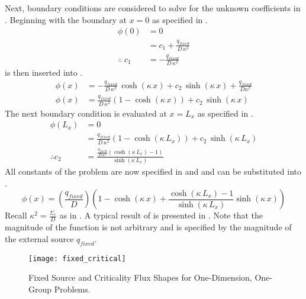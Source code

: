   Next, boundary conditions are considered to solve for the unknown coefficients
  in . Beginning with the boundary at $x=0$ as 
  specified in .
  \begin{align}
    \phi(0) &= 0 \\
    &= c_1 + \frac{q_{fixed}}{D\,\kappa^2} \\
    \label{eq:1dfixed_c1}
    \therefore \; c_1 &= - \frac{q_{fixed}}{D\,\kappa^2}
  \end{align}
   is then inserted into .
  \begin{align}
    \phi(x) &= -\frac{q_{fixed}}{D\,\kappa^2} \, \cosh(\kappa \, x) + c_2 \,
      \sinh(\kappa \, x) + \frac{q_{fixed}}{D\kappa^2} \\
    \phi(x) &= \frac{q_{fixed}}{D\,\kappa^2} \left( 1- \cosh(\kappa \, x)  
      \right) + c_2 \, \sinh(\kappa \, x)
  \end{align}
  The next boundary condition is evaluated at $x=L_x$ as specified in
  .
  \begin{align}
    \phi(L_x) &= 0 \\
    &= \frac{q_{fixed}}{D\,\kappa^2} \left( 1- \cosh(\kappa \, L_x )  \right) + 
      c_2 \, \sinh(\kappa \, L_x) \\
    \label{eq:1dfixed_c2}
    \therefore c_2 &= \frac{\frac{q_{fixed}}{D\,\kappa^2} 
      \left(\cosh(\kappa \, L_x) - 1 \right)} {\sinh(\kappa \, L_x)}
  \end{align}
  All constants of the problem are now specified in  and 
   and can be substituted into .
  \begin{equation}
    \label{eq:analytic_1dfixedsrc}
    \phi(x) = \left( \frac{q_{fixed}}{D} \right) 
      \left( 1-\cosh(\kappa\,x) +
      \frac{\cosh(\kappa\,L_x)-1}{\sinh(\kappa\,L_x)}
      \sinh(\kappa\,x)\right)
  \end{equation}
  Recall $\kappa^2 = \frac{\Sigma_r}{D}$ as in . A typical 
  result of  is presented in
  . Note that the magnitude of the function is not
  arbitrary and is specified by the magnitude of the external source
  $q_{fixed}$.

  \begin{figure}
    \centering
    \texttt{[image: fixed\_critical]}
    \caption{Fixed Source and Criticality Flux Shapes for One-Dimension,
      One-Group Problems.}
    \label{fig:fixed_critical}
  \end{figure}
  
